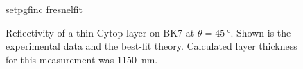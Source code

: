 \begin{figure}
 \centering
 {setpgfinc}
 {fresnelfit}
 \caption{Reflectivity of a thin Cytop layer on BK7 at
 $\theta=\SI{45}{\degree}$.  Shown is the experimental data and the
 best-fit theory.  Calculated layer thickness for this measurement was
\SI{1150}{\nano\meter}.}
 \label{fig:fresnelfit}
\end{figure}
